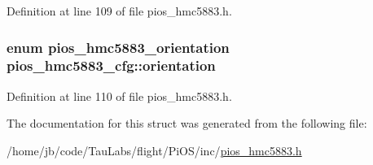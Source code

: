 \-Definition at line 109 of file pios\-\_\-hmc5883.\-h.

\hypertarget{structpios__hmc5883__cfg_ab8151b7d77ee14eb956089aa262c8de7}{
\subsubsection[{orientation}]{\setlength{\rightskip}{0pt plus 5cm}enum {\bf pios\-\_\-hmc5883\-\_\-orientation} {\bf pios\-\_\-hmc5883\-\_\-cfg\-::orientation}}}\label{structpios__hmc5883__cfg_ab8151b7d77ee14eb956089aa262c8de7}


\-Definition at line 110 of file pios\-\_\-hmc5883.\-h.



\-The documentation for this struct was generated from the following file\-:\begin{DoxyCompactItemize}
\item 
/home/jb/code/\-Tau\-Labs/flight/\-Pi\-O\-S/inc/\hyperlink{pios__hmc5883_8h}{pios\-\_\-hmc5883.\-h}\end{DoxyCompactItemize}

